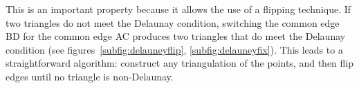 %
This is an important property because it allows the use of a flipping technique. If two triangles do not meet the Delaunay condition, switching the common edge BD for the common edge AC produces two triangles that do meet the Delaunay condition (see figures~\ref{subfig:delauneyflip}, \ref{subfig:delauneyfix}).
%
This leads to a straightforward algorithm: construct any triangulation of the points, and then flip edges until no triangle is non-Delaunay.